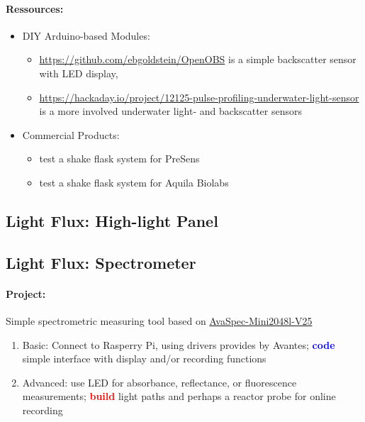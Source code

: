 \documentclass[12pt,a4paper]{scrartcl}
\newcommand{\build}[0]{\textcolor{red}{\textbf{build}}}
\newcommand{\code}[0]{\textcolor{blue}{\textbf{code}}}
\begin{document}
\paragraph{Ressources:}
\begin{itemize}
  \setlength\itemsep{0em}
\item DIY Arduino-based Modules:
  \begin{itemize}
    \setlength\itemsep{-1em}
  \item \url{https://github.com/ebgoldstein/OpenOBS} is a simple
    backscatter sensor with LED display, 
  \item \url{https://hackaday.io/project/12125-pulse-profiling-underwater-light-sensor}
    is a more involved underwater light- and backscatter sensors
  \end{itemize}
\item Commercial Products:
  \begin{itemize}
    \setlength\itemsep{-1em}
  \item \cite{Ude2014} test a shake flask system for PreSens
  \item \cite{Bruder2016} test a shake flask system for Aquila Biolabs
  \end{itemize}
\end{itemize}

\clearpage
\subsection{Light Flux: High-light Panel} 
\label{led}

\clearpage
\subsection{Light Flux: Spectrometer} 
\label{spec}
\paragraph{Project:} 
Simple spectrometric measuring tool based on
\href{http://www.avantes.com/products/spectrometers/compactline/item/723-avaspec-mini}{AvaSpec-Mini2048l-V25}

\begin{enumerate}
\item Basic: Connect to Rasperry Pi, using drivers provides by
  Avantes; \code{} simple interface with display and/or recording
  functions
\item Advanced: use LED for absorbance, reflectance, or fluorescence
  measurements; \build{} light paths and perhaps a reactor probe for
  online recording
\end{enumerate}
\end{document}
